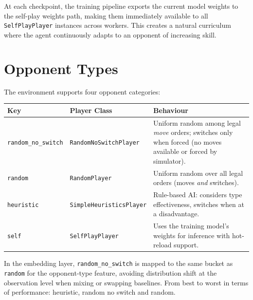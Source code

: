 At each checkpoint, the training pipeline exports the current model weights to
the self-play weights path, making them immediately available to all
\texttt{SelfPlayPlayer} instances across workers.  This creates a natural
curriculum where the agent continuously adapts to an opponent of increasing
skill.


\section{Opponent Types}

The environment supports four opponent categories:

\begin{center}
\small
\begin{tabularx}{\textwidth}{l l X}
  \toprule
  \textbf{Key} & \textbf{Player Class} & \textbf{Behaviour} \\
  \midrule
  \texttt{random\_no\_switch} & \texttt{RandomNoSwitchPlayer} &
    Uniform random among legal \emph{move} orders; switches only when forced
    (no moves available or forced by simulator). \\
  \texttt{random} & \texttt{RandomPlayer} &
    Uniform random over all legal orders (moves \emph{and} switches). \\
  \texttt{heuristic} & \texttt{SimpleHeuristicsPlayer} &
    Rule-based AI: considers type effectiveness, switches when at a
    disadvantage. \\
  \texttt{self} & \texttt{SelfPlayPlayer} &
    Uses the training model's weights for inference with hot-reload support. \\
  \bottomrule
\end{tabularx}
\end{center}

In the embedding layer, \texttt{random\_no\_switch} is mapped to the same
bucket as \texttt{random} for the opponent-type feature, avoiding distribution
shift at the observation level when mixing or swapping baselines. From best to worst in terms of performance: heuristic, random no switch and random.
